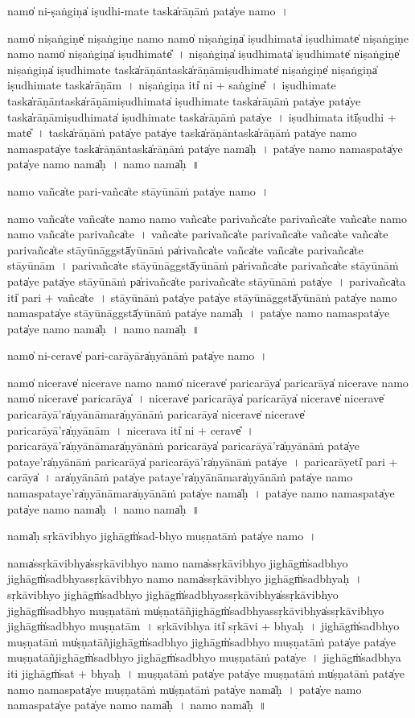 \documentclass[parskip, DIV=14]{scrartcl}
\begin{document}
{namo̍ ni-ṣa॒ṅgiṇa̍ iṣudhi॒-mate॒ taska̍rāṇā॒ṁ pata̍ye॒ namo॒~।

namo̍ niṣa॒ṅgiṇe̍ niṣa॒ṅgiṇe॒ namo॒ namo̍ niṣa॒ṅgiṇa̍ iṣudhi॒mata̍ iṣudhi॒mate̍ niṣa॒ṅgiṇe॒ namo॒ namo̍ niṣa॒ṅgiṇa̍ iṣudhi॒mate̎~।
ni॒ṣa॒ṅgiṇa̍ iṣudhi॒mata̍ iṣudhi॒mate̍ niṣa॒ṅgiṇe̍ niṣa॒ṅgiṇa̍ iṣudhi॒mate॒ taska̍rāṇā॒ntaska̍rāṇāmiṣudhi॒mate̍ niṣa॒ṅgiṇe̍ niṣa॒ṅgiṇa̍ iṣudhi॒mate॒ taska̍rāṇām~।
ni॒ṣa॒ṅgiṇa॒ iti̍ ni + sa॒ṅgine̎~।
i॒ṣu॒dhi॒mate॒ taska̍rāṇā॒ntaska̍rāṇāmiṣudhi॒mata̍ iṣudhi॒mate॒ taska̍rāṇā॒ṁ pata̍ye॒ pata̍ye॒ taska̍rāṇāmiṣudhi॒mata̍ iṣudhi॒mate॒ taska̍rāṇā॒ṁ pata̍ye~।
i॒ṣu॒dhi॒mata॒ itī̍ṣudhi + mate̎~।
taska̍rāṇā॒ṁ pata̍ye॒ pata̍ye॒ taska̍rāṇā॒ntaska̍rāṇā॒ṁ pata̍ye॒ namo॒ nama॒spata̍ye॒ taska̍rāṇā॒ntaska̍rāṇā॒ṁ pata̍ye॒ nama̍ḥ~।
pata̍ye॒ namo॒ nama॒spata̍ye॒ pata̍ye॒ namo॒ nama̍ḥ~।
namo॒ nama̍ḥ~॥ 

namo॒ vañca̍te pari॒-vañca̍te stāyū॒nāṁ pata̍ye॒ namo॒~।

namo॒ vañca̍te॒ vañca̍te॒ namo॒ namo॒ vañca̍te pari॒vañca̍te pari॒vañca̍te॒ vañca̍te॒ namo॒ namo॒ vañca̍te pari॒vañca̍te~।
vañca̍te pari॒vañca̍te pari॒vañca̍te॒ vañca̍te॒ vañca̍te pari॒vañca̍te stāyū॒nāggstā̍yū॒nāṁ pa̍ri॒vañca̍te॒ vañca̍te॒ vañca̍te pari॒vañca̍te stāyū॒nām~।
pa॒ri॒vañca̍te stāyū॒nāggstā̍yū॒nāṁ pa̍ri॒vañca̍te pari॒vañca̍te stāyū॒nāṁ pata̍ye॒ pata̍ye stāyū॒nāṁ pa̍ri॒vañca̍te pari॒vañca̍te stāyū॒nāṁ pata̍ye~।
pa॒ri॒vañca̍ta॒ iti̍ pari + vañca̍te~।
stā॒yū॒nāṁ pata̍ye॒ pata̍ye stāyū॒nāggstā̍yū॒nāṁ pata̍ye॒ namo॒ nama॒spata̍ye stāyū॒nāggstā̍yū॒nāṁ pata̍ye॒ nama̍ḥ~।
pata̍ye॒ namo॒ nama॒spata̍ye॒ pata̍ye॒ namo॒ nama̍ḥ~।
namo॒ nama̍ḥ~॥ 

namo̍ ni-ce॒rave̍ pari-ca॒rāyāra̍ṇyānā॒ṁ pata̍ye॒ namo॒~।

namo̍ nice॒rave̍ nice॒rave॒ namo॒ namo̍ nice॒rave̍ parica॒rāya̍ parica॒rāya̍ nice॒rave॒ namo॒ namo̍ nice॒rave̍ parica॒rāya̍~।
ni॒ce॒rave̍ parica॒rāya̍ parica॒rāya̍ nice॒rave̍ nice॒rave̍ parica॒rāyā'ra̍ṇyānā॒mara̍ṇyānāṁ parica॒rāya̍ nice॒rave̍ nice॒rave̍ parica॒rāyā'ra̍ṇyānām~।
ni॒ce॒rava॒ iti̍ ni + ce॒rave̎~।
pa॒ri॒ca॒rāyā'ra̍ṇyānā॒mara̍ṇyānāṁ parica॒rāya̍ parica॒rāyā'ra̍ṇyānā॒ṁ pata̍ye॒ pata॒ye'ra̍ṇyānāṁ parica॒rāya̍ parica॒rāyā'ra̍ṇyānā॒ṁ pata̍ye~।
pa॒ri॒ca॒rāyeti̍ pari + ca॒rāya̍~।
ara̍ṇyānā॒ṁ pata̍ye॒ pata॒ye'ra̍ṇyānā॒mara̍ṇyānā॒ṁ pata̍ye॒ namo॒ nama॒spata॒ye'ra̍ṇyānā॒mara̍ṇyānā॒ṁ pata̍ye॒ nama̍ḥ~।
pata̍ye॒ namo॒ nama॒spata̍ye॒ pata̍ye॒ namo॒ nama̍ḥ~।
namo॒ nama̍ḥ~॥ 

nama̍ḥ sṛkā॒vibhyo॒ jighāgṁ̍sad-bhyo muṣṇa॒tāṁ pata̍ye॒ namo॒~।

nama̍ssṛkā॒vibhya̍ssṛkā॒vibhyo॒ namo॒ nama̍ssṛkā॒vibhyo॒ jighāgṁ̍sadbhyo॒ jighāgṁ̍sadbhyassṛkā॒vibhyo॒ namo॒ nama̍ssṛkā॒vibhyo॒ jighāgṁ̍sadbhyaḥ~।
sṛ॒kā॒vibhyo॒ jighāgṁ̍sadbhyo॒ jighāgṁ̍sadbhyassṛkā॒vibhya̍ssṛkā॒vibhyo॒ jighāgṁ̍sadbhyo muṣṇa॒tāṁ mu̍ṣṇa॒tāñjighāgṁ̍sadbhyassṛkā॒vibhya̍ssṛkā॒vibhyo॒ jighāgṁ̍sadbhyo muṣṇa॒tām~।
sṛ॒kā॒vibhya॒ iti̍ sṛkā॒vi + bhya॒ḥ~।
jighāgṁ̍sadbhyo muṣṇa॒tāṁ mu̍ṣṇa॒tāñjighāgṁ̍sadbhyo॒ jighāgṁ̍sadbhyo muṣṇa॒tāṁ pata̍ye॒ pata̍ye muṣṇa॒tāñjighāgṁ̍sadbhyo॒ jighāgṁ̍sadbhyo muṣṇa॒tāṁ pata̍ye~।
jighāgṁ̍sadbhya॒ iti॒  jighāgṁ̍sat + bhya॒ḥ~।
mu॒ṣṇa॒tāṁ pata̍ye॒ pata̍ye muṣṇa॒tāṁ mu̍ṣṇa॒tāṁ pata̍ye॒ namo॒ nama॒spata̍ye muṣṇa॒tāṁ mu̍ṣṇa॒tāṁ pata̍ye॒ nama̍ḥ~।
pata̍ye॒ namo॒ nama॒spata̍ye॒ pata̍ye॒ namo॒ nama̍ḥ~।
namo॒ nama̍ḥ~॥ 

}
\end{document}
